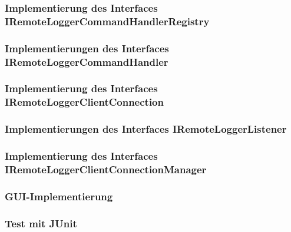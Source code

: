 \vspace{-1px}
\subsubsection{Implementierung des Interfaces \\\glqq IRemoteLoggerCommandHandlerRegistry\grqq}

\newpage

\subsubsection{Implementierungen des Interfaces \glqq IRemoteLoggerCommandHandler\grqq}

\newpage

\subsubsection{Implementierung des Interfaces \glqq IRemoteLoggerClientConnection\grqq}

\newpage

\subsubsection{Implementierungen des Interfaces \glqq IRemoteLoggerListener\grqq}


\subsubsection{Implementierung des Interfaces \\\glqq IRemoteLoggerClientConnectionManager\grqq}

\newpage

\subsubsection{GUI-Implementierung}


\subsubsection{Test mit JUnit}
